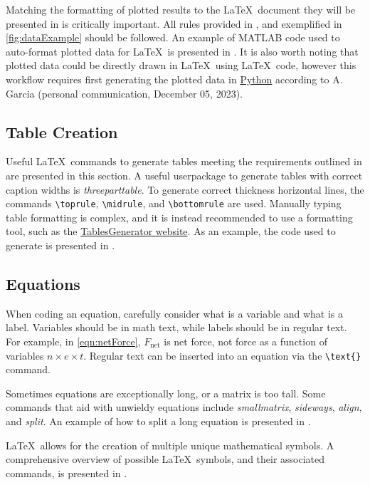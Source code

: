 Matching the formatting of plotted results to the \LaTeX\ document they will be presented in is critically important. 
All rules provided in , and exemplified in \cref{fig:dataExample} should be followed. 
An example of MATLAB code used to auto-format plotted data for \LaTeX\ is presented in . 
It is also worth noting that plotted data could be directly drawn in \LaTeX\, using \LaTeX\ code, however this workflow requires first generating the plotted data in \href{https://www.python.org/}{Python} according to A. Garcia (personal communication, December 05, 2023).

\subsection{Table Creation}
Useful \LaTeX\ commands to generate tables meeting the requirements outlined in  are presented in this section. 
A useful userpackage to generate tables with correct caption widths is \textit{threeparttable}. 
To generate correct thickness horizontal lines, the commands \verb*|\toprule|, \verb*|\midrule|, and \verb*|\bottomrule| are used. 
Manually typing table formatting is complex, and it is instead recommended to use a formatting tool, such as the \href{https://www.tablesgenerator.com/}{TablesGenerator website}. 
As an example, the code used to generate  is presented in . 


\subsection{Equations}
When coding an equation, carefully consider what is a variable and what is a label. 
Variables should be in math text, while labels should be in regular text. 
For example, in \cref{eqn:netForce}, $F_{\text{net}}$ is net force, not force as a function of variables $n \times e \times t$. 
Regular text can be inserted into an equation via the \verb*|\text{}| command. 


Sometimes equations are exceptionally long, or a matrix is too tall. Some commands that aid with unwieldy equations include \textit{smallmatrix}, \textit{sideways}, \textit{align}, and \textit{split}.	
An example of how to split a long equation is presented in .


\LaTeX\ allows for the creation of multiple unique mathematical symbols. A comprehensive overview of possible \LaTeX\ symbols, and their associated commands, is presented in . 

